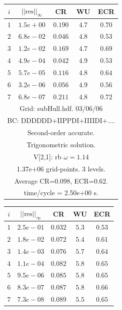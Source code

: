 \begin{table}[hbt]
\begin{center}
{\tablefontsize
\begin{tabular}{|c|c|c|c|c|} \hline 
 $i$   & $\vert\vert\mbox{res}\vert\vert_\infty$  &  CR     &  WU    & ECR  \\   \hline 
 $ 1$  & $ 1.5e+00$ & $0.190$ & $ 4.7$ & $0.70$ \\ 
 $ 2$  & $ 6.8e-02$ & $0.046$ & $ 4.8$ & $0.53$ \\ 
 $ 3$  & $ 1.2e-02$ & $0.169$ & $ 4.7$ & $0.69$ \\ 
 $ 4$  & $ 4.9e-04$ & $0.042$ & $ 4.9$ & $0.53$ \\ 
 $ 5$  & $ 5.7e-05$ & $0.116$ & $ 4.8$ & $0.64$ \\ 
 $ 6$  & $ 3.2e-06$ & $0.056$ & $ 4.9$ & $0.56$ \\ 
 $ 7$  & $ 6.8e-07$ & $0.211$ & $ 4.8$ & $0.72$ \\ 
\hline 
\multicolumn{5}{|c|}{Grid: subHull.hdf. 03/06/06}  \\
\multicolumn{5}{|c|}{BC: DDDDDD+IIPPDI+IIIIDI+....}  \\
\multicolumn{5}{|c|}{Second-order accurate.}  \\
\multicolumn{5}{|c|}{Trigonometric solution.}  \\
\multicolumn{5}{|c|}{V[2,1]: rb $\omega=1.14$}  \\
\multicolumn{5}{|c|}{1.37e+06 grid-points. 3 levels.}  \\
\multicolumn{5}{|c|}{Average CR=$0.098$, ECR=$0.62$.}  \\
\multicolumn{5}{|c|}{time/cycle = 2.50e+00 s.}  \\
\hline 
\end{tabular}
\begin{tabular}{|c|c|c|c|c|} \hline 
 $i$   & $\vert\vert\mbox{res}\vert\vert_\infty$  &  CR     &  WU    & ECR  \\   \hline 
 $ 1$  & $ 2.5e-01$ & $0.032$ & $ 5.3$ & $0.53$ \\ 
 $ 2$  & $ 1.8e-02$ & $0.072$ & $ 5.4$ & $0.61$ \\ 
 $ 3$  & $ 1.4e-03$ & $0.076$ & $ 5.7$ & $0.64$ \\ 
 $ 4$  & $ 1.1e-04$ & $0.082$ & $ 5.8$ & $0.65$ \\ 
 $ 5$  & $ 9.5e-06$ & $0.085$ & $ 5.8$ & $0.65$ \\ 
 $ 6$  & $ 8.3e-07$ & $0.087$ & $ 5.8$ & $0.66$ \\ 
 $ 7$  & $ 7.3e-08$ & $0.089$ & $ 5.5$ & $0.65$ \\ 

\end{tabular}}
\end{center}
\end{table}
